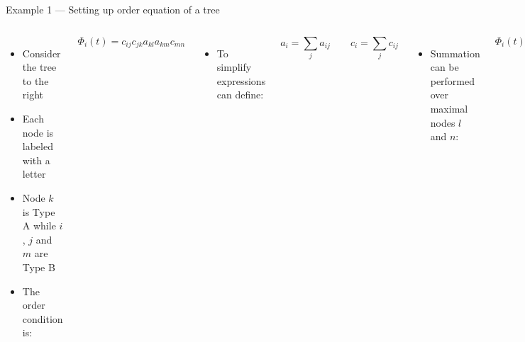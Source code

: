 \documentclass[serif]{beamer}
\begin{document}
\begin{frame}{Example 1 --- Setting up order equation of a tree}
  \begin{columns}[T]
  \begin{itemize}
  \item<1-> Consider the tree to the right
  \item<1-> Each node is labeled with a letter
  \item<1-> Node $k$ is Type A while $i$, $j$ and $m$ are Type B
  \item<1-> The order condition is:
  \end{itemize}
  \begin{equation}
    \nonumber
    \Phi_i\left(t\right) = c_{ij}c_{jk}a_{kl}a_{km}c_{mn}
  \end{equation}\vspace{-0.5cm}
  \begin{itemize}
  \item<1-> To simplify expressions can define:
  \end{itemize}
  \begin{equation}
    \nonumber
    a_i = \sum_j a_{ij} \qquad c_i = \sum_j c_{ij}
  \end{equation}\vspace{-0.5cm}
  \begin{itemize}
  \item<1-> Summation can be performed over maximal nodes $l$ and $n$:
  \end{itemize}
  \begin{equation}
    \nonumber
    \Phi_i\left(t\right) = c_{ij}c_{jk}a_{k}a_{km}c_{m}
  \end{equation}
  \vspace{0.8cm}
  \end{columns}
\end{frame}
\end{document}
